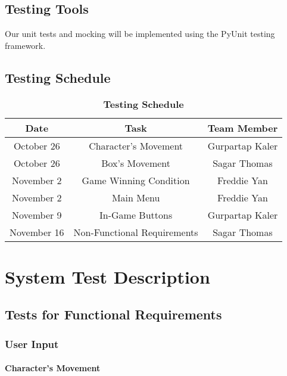 \documentclass[12pt, titlepage]{article}
\begin{document}
\subsection{Testing Tools}
Our unit tests and mocking will be implemented using the PyUnit testing framework.

\subsection{Testing Schedule}

\begin{table}[!htbp]
\centering
\caption{\textbf{Testing Schedule}} \label{Table}	
\begin{tabular}{ccc}
\hline
     Date & Task & Team Member \\
     \hline
     October 26 & Character's Movement & Gurpartap Kaler \\
     \hline
          October 26 & Box's Movement & Sagar Thomas \\
     \hline
          November 2 & Game Winning Condition & Freddie Yan \\
     \hline
          November 2 & Main Menu & Freddie Yan  \\
               \hline
          November 9 & In-Game Buttons & Gurpartap Kaler  \\
          \hline
            November 16 & Non-Functional Requirements & Sagar Thomas
\end{tabular}
\end{table}

\section{System Test Description}
	
\subsection{Tests for Functional Requirements}

\subsubsection{User Input}
		
\paragraph{Character's Movement}
\end{document}
